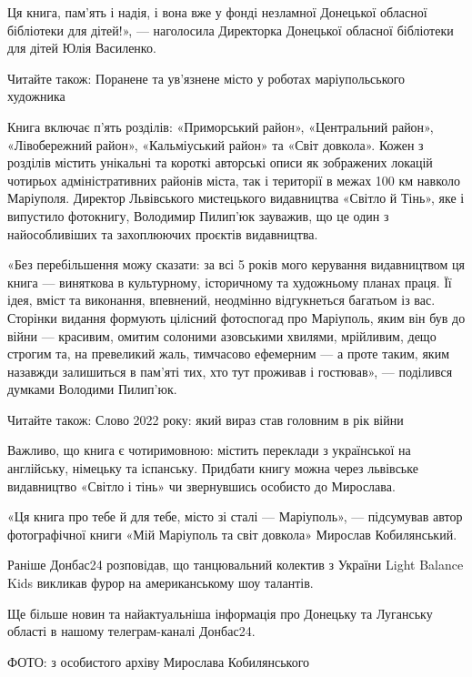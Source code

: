Ця книга, пам'ять і надія, і вона вже у фонді незламної Донецької обласної
бібліотеки для дітей!», — наголосила Директорка Донецької обласної бібліотеки
для дітей Юлія Василенко.

Читайте також: Поранене та ув'язнене місто у роботах маріупольського художника

Книга включає п'ять розділів: «Приморський район», «Центральний район»,
«Лівобережний район», «Кальміуський район» та «Світ довкола». Кожен з розділів
містить унікальні та короткі авторські описи як зображених локацій чотирьох
адміністративних районів міста, так і території в межах 100 км навколо
Маріуполя. Директор Львівського мистецького видавництва «Світло й Тінь», яке і
випустило фотокнигу, Володимир Пилип'юк зауважив, що це один з найособливіших
та захоплюючих проєктів видавництва.

«Без перебільшення можу сказати: за всі 5 років мого керування видавництвом ця
книга — виняткова в культурному, історичному та художньому планах праця. Її
ідея, вміст та виконання, впевнений, неодмінно відгукнеться багатьом із вас.
Сторінки видання формують цілісний фотоспогад про Маріуполь, яким він був до
війни — красивим, омитим солоними азовськими хвилями, мрійливим, дещо строгим
та, на превеликий жаль, тимчасово ефемерним — а проте таким, яким назавжди
залишиться в пам'яті тих, хто тут проживав і гостював», — поділився думками
Володими Пилип'юк.

Читайте також: Слово 2022 року: який вираз став головним в рік війни

Важливо, що книга є чотиримовною: містить переклади з української на
англійську, німецьку та іспанську. Придбати книгу можна через львівське
видавництво «Світло і тінь» чи звернувшись особисто до Мирослава.

«Ця книга про тебе й для тебе, місто зі сталі — Маріуполь», — підсумував автор
фотографічної книги «Мій Маріуполь та світ довкола» Мирослав Кобилянський.


Раніше Донбас24 розповідав, що танцювальний колектив з України Light Balance
Kids викликав фурор на американському шоу талантів.

Ще більше новин та найактуальніша інформація про Донецьку та Луганську області
в нашому телеграм-каналі Донбас24.

ФОТО: з особистого архіву Мирослава Кобилянського
